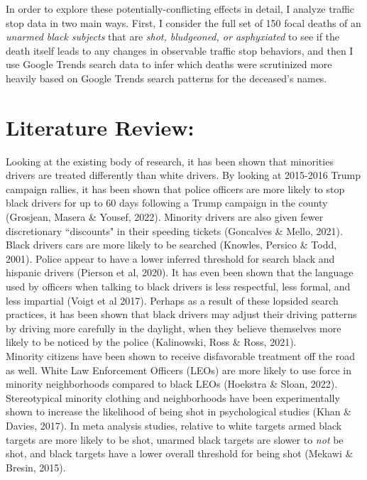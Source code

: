 \documentclass[12pt,a4paper]{article}
\begin{document}
In order to explore these potentially-conflicting effects in detail, I analyze traffic stop data in two main ways. First, I consider the full set of 150 focal deaths of an \textit{unarmed black subjects} that are \textit{shot, bludgeoned, or asphyxiated} to see if the death itself leads to any changes in observable traffic stop behaviors, and then I use Google Trends search data to infer which deaths were scrutinized more heavily based on Google Trends search patterns for the deceased's names. \\


\section{Literature Review:}
Looking at the existing body of research, it has been shown that minorities drivers are treated differently than white drivers. By looking at 2015-2016 Trump campaign rallies, it has been shown that police officers are more likely to stop black drivers for up to 60 days following a Trump campaign in the county (Grosjean, Masera \& Yousef, 2022). Minority drivers are also given fewer discretionary ``discounts" in their speeding tickets (Goncalves \& Mello, 2021). Black drivers cars are more likely to be searched (Knowles, Persico \& Todd, 2001). Police appear to have a lower inferred threshold for search black and hispanic drivers (Pierson et al, 2020). It has even been shown that the language used by officers when talking to black drivers is less respectful, less formal, and less impartial (Voigt et al 2017). Perhaps as a result of these lopsided search practices, it has been shown that black drivers may adjust their driving patterns by driving more carefully in the daylight, when they believe themselves more likely to be noticed by the police (Kalinowski, Ross \& Ross, 2021). \\

Minority citizens have been shown to receive disfavorable treatment off the road as well. White Law Enforcement Officers (LEOs) are more likely to use force in minority neighborhoods compared to black LEOs (Hoekstra \& Sloan, 2022). Stereotypical minority clothing and neighborhoods have been experimentally shown to increase the likelihood of being shot in psychological studies (Khan \& Davies, 2017). In meta analysis studies, relative to white targets armed black targets are more likely to be shot, unarmed black targets are slower to \textit{not} be shot, and black targets have a lower overall threshold for being shot (Mekawi \& Bresin, 2015). \\
\end{document}
